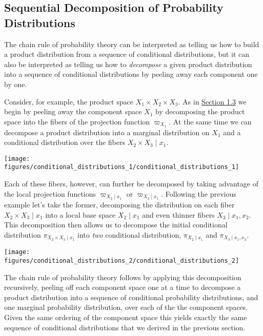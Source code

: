 \documentclass[]{article}
\begin{document}
\hypertarget{sequential-decomposition-of-probability-distributions}{%
\subsection{Sequential Decomposition of Probability
Distributions}\label{sequential-decomposition-of-probability-distributions}}

The chain rule of probability theory can be interpreted as telling us
how to build a product distribution from a sequence of conditional
distributions, but it can also be interpreted as telling us how to
\emph{decompose} a given product distribution into a sequence of
conditional distributions by peeling away each component one by one.

Consider, for example, the product space
\(X_{1} \times X_{2} \times X_{3}\). As in
\href{sec:decomposing_product_spaces}{Section 1.3} we begin by peeling
away the component space \(X_{1}\) by decomposing the product space into
the fibers of the projection function \(\varpi_{X_{1}}\). At the same
time we can decompose a product distribution into a marginal
distribution on \(X_{1}\) and a conditional distribution over the fibers
\(X_{2} \times X_{3} \mid x_{1}\).

\texttt{[image: figures/conditional\_distributions\_1/conditional\_distributions\_1]}

Each of these fibers, however, can further be decomposed by taking
advantage of the local projection functions
\(\varpi_{X_{2} \mid x_{1}}\) or \(\varpi_{X_{3} \mid x_{1}}\).
Following the previous example let's take the former, decomposing the
distribution on each fiber \(X_{2} \times X_{3} \mid x_{1}\) into a
local base space \(X_{2} \mid x_{1}\) and even thinner fibers
\(X_{3} \mid x_{1}, x_{2}\). This decomposition then allows us to
decompose the initial conditional distribution
\(\pi_{X_{2} \times X_{3} \mid x_{1}}\) into \emph{two} conditional
distribution, \(\pi_{X_{2} \mid x_{1}}\) and
\(\pi_{X_{3} \mid x_{1}, x_{2}}\).

\texttt{[image: figures/conditional\_distributions\_2/conditional\_distributions\_2]}

The chain rule of probability theory follows by applying this
decomposition recursively, peeling off each component space one at a
time to decompose a product distribution into a sequence of conditional
probability distributions, and one marginal probability distribution,
over each of the the component spaces. Given the same ordering of the
component space this yields exactly the same sequence of conditional
distributions that we derived in the previous section.
\end{document}
